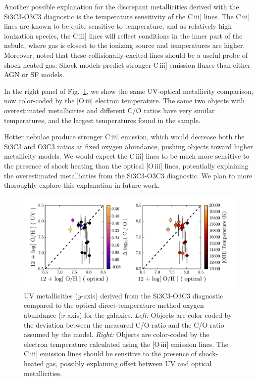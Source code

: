 \documentclass[preprint2]{aastex62}
\newcommand{\oiii}{[O\,{\sc iii}]\xspace}
\newcommand{\ciii}{C\,{\sc iii}]\xspace}
\begin{document}
Another possible explanation for the discrepant metallicities derived with the Si3C3-O3C3 diagnostic is the temperature sensitivity of the \ciii lines. The \ciii lines are known to be quite sensitive to temperature, and as relatively high ionization species, the \ciii lines will reflect conditions in the inner part of the nebula, where gas is closest to the ionizing source and temperatures are higher. Moreover, \citet{Dopita+1997} noted that these collisionally-excited lines should be a useful probe of shock-heated gas. Shock models predict stronger \ciii emission fluxes than either AGN or SF models.

In the right panel of Fig.~\ref{fig:CO}, we show the same UV-optical metallicity comparison, now color-coded by the \oiii electron temperature. The same two objects with overestimated metallicities and different C/O ratios have very similar temperatures, and the largest temperatures found in the \citet{Berg+2016} sample.

Hotter nebulae produce stronger \ciii emission, which would decrease both the Si3C3 and O3C3 ratios at fixed oxygen abundance, pushing objects toward higher metallicity models. We would expect the \ciii lines to be much more sensitive to the presence of shock heating than the optical \oiii lines, potentially explaining the overestimated metallicities from the Si3C3-O3C3 diagnostic. We plan to more thoroughly explore this explanation in future work.

\begin{figure}
  \begin{center}
    \includegraphics[width=\linewidth]{figs/f9.png}
    \caption{UV metallicities ($y$-axis) derived from the Si3C3-O3C3 diagnostic compared to the optical direct-temperature method oxygen abundance ($x$-axis) for the \citet{Berg+2016} galaxies. \emph{Left:} Objects are color-coded by the deviation between the measured C/O ratio and the C/O ratio assumed by the \citet{Byler+2018} model. \emph{Right:} Objects are color-coded by the electron temperature calculated using the \oiii emission lines. The \ciii emission lines should be sensitive to the presence of shock-heated gas, possibly explaining offset between UV and optical metallicities.}
    \label{fig:CO}
  \end{center}
\end{figure}
\end{document}
